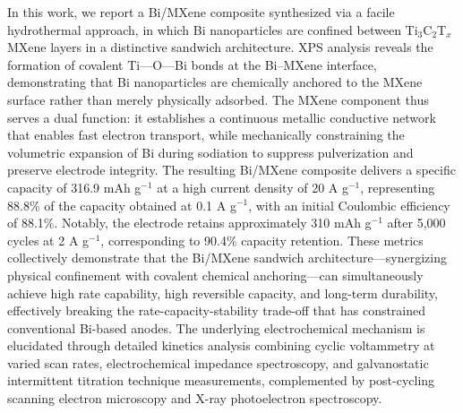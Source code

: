 In this work, we report a Bi/MXene composite synthesized via a facile hydrothermal approach, in which Bi nanoparticles are confined between Ti$_{3}$C$_{2}$T$_{x}$ MXene layers in a distinctive sandwich architecture. XPS analysis reveals the formation of covalent Ti---O---Bi bonds at the Bi--MXene interface, demonstrating that Bi nanoparticles are chemically anchored to the MXene surface rather than merely physically adsorbed. The MXene component thus serves a dual function: it establishes a continuous metallic conductive network that enables fast electron transport, while mechanically constraining the volumetric expansion of Bi during sodiation to suppress pulverization and preserve electrode integrity. The resulting Bi/MXene composite delivers a specific capacity of 316.9 mAh g$^{-1}$ at a high current density of 20 A g$^{-1}$, representing 88.8\% of the capacity obtained at 0.1 A g$^{-1}$, with an initial Coulombic efficiency of 88.1\%. Notably, the electrode retains approximately 310 mAh g$^{-1}$ after 5,000 cycles at 2 A g$^{-1}$, corresponding to 90.4\% capacity retention. These metrics collectively demonstrate that the Bi/MXene sandwich architecture---synergizing physical confinement with covalent chemical anchoring---can simultaneously achieve high rate capability, high reversible capacity, and long-term durability, effectively breaking the rate-capacity-stability trade-off that has constrained conventional Bi-based anodes. The underlying electrochemical mechanism is elucidated through detailed kinetics analysis combining cyclic voltammetry at varied scan rates, electrochemical impedance spectroscopy, and galvanostatic intermittent titration technique measurements, complemented by post-cycling scanning electron microscopy and X-ray photoelectron spectroscopy.
